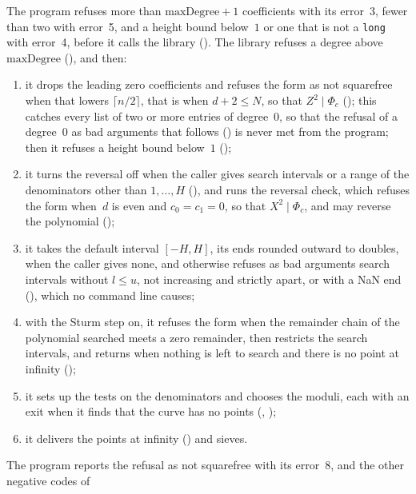 The program refuses more than $\mathrm{maxDegree} + 1$ coefficients with its error~3, fewer than two
with error~5, and a height bound below~$1$ or one that is not a \verb|long| with error~4, before it
calls the library (). The library refuses a degree above
$\mathrm{maxDegree}$ (), and then:
\begin{enumerate}
  \item it drops the leading zero coefficients and refuses the form as not squarefree when that
    lowers $\lceil n/2 \rceil$, that is when $d + 2 \le N$, so that $Z^2 \mid \Phi_c$
    (); this catches every list of two or more entries of
    degree~$0$, so that the refusal of a degree~$0$ as bad arguments that follows
    () is never met from the program; then it refuses a height
    bound below~$1$ ();
  \item it turns the reversal off when the caller gives search intervals or a range of the
    denominators other than $1, \dots, H$ (), and runs the
    reversal check, which refuses the form when~$d$ is even and $c_0 = c_1 = 0$, so that
    $X^2 \mid \Phi_c$, and may reverse the polynomial ();
  \item it takes the default interval $[-H, H]$, its ends rounded outward to doubles, when the
    caller gives none, and otherwise refuses as bad arguments search intervals without $l \le u$,
    not increasing and strictly apart, or with a NaN end (),
    which no command line causes;
  \item with the Sturm step on, it refuses the form when the remainder chain of the polynomial
    searched meets a zero remainder, then restricts the search intervals, and returns when nothing
    is left to search and there is no point at infinity ();
  \item it sets up the tests on the denominators and chooses the moduli, each with an exit when it
    finds that the curve has no points (,
    );
  \item it delivers the points at infinity () and sieves.
\end{enumerate}
The program reports the refusal as not squarefree with its error~8, and the other negative codes of

